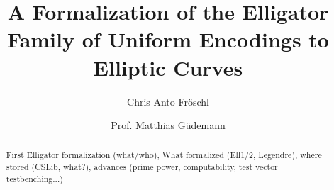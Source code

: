 \documentclass[11pt]{amsart}
\title{A Formalization of the Elligator Family of Uniform Encodings
  to Elliptic Curves}
\author{Chris Anto Fröschl\orcidlink{0009-0006-3562-5395}}
\author{Prof. Matthias Güdemann\orcidlink{0000-0002-1002-6023}}
\theoremstyle{definition}
\theoremstyle{remark}
\begin{document}
\begin{abstract}
First Elligator formalization (what/who), What formalized (Ell1/2, Legendre), where stored (CSLib, what?), advances (prime power, computability, test vector testbenching...)
\end{abstract}

\maketitle












\end{document}
